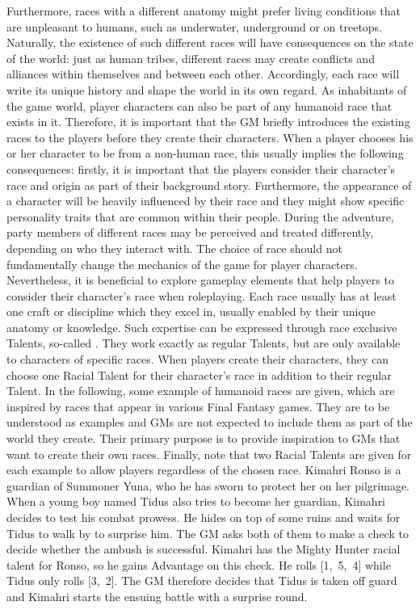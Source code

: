 Furthermore, races with a different anatomy might prefer living conditions that are unpleasant to humans, such as underwater, underground or on treetops.
Naturally, the existence of such different races will have consequences on the state of the world:
just as human tribes, different races may create conflicts and alliances within themselves and between each other.
Accordingly, each race will write its unique history and shape the world in its own regard.
%
\newpage
%
\ofpar
%
As inhabitants of the game world, player characters can also be part of any humanoid race that exists in it.
Therefore, it is important that the GM briefly introduces the existing races to the players before they create their characters.  
When a player chooses his or her character to be from a non-human race, this usually implies the following consequences:  
firstly, it is important that the players consider their character's race and origin as part of their background story.
Furthermore, the appearance of a character will be heavily influenced by their race and they might show specific personality traits that are common within their people. 
During the adventure, party members of different races may be perceived and treated differently, depending on who they interact with.
%
\vfill
%
The choice of race should not fundamentally change the mechanics of the game for player characters.
Nevertheless, it is beneficial to explore gameplay elements that help players to consider their character's race when roleplaying.
Each race usually has at least one craft or discipline which they excel in, usually enabled by their unique anatomy or knowledge.
Such expertise can be expressed through race exclusive Talents, so-called .
They work exactly as regular Talents, but are only available to characters of specific races.
When players create their characters, they can choose one Racial Talent for their character's race in addition to their regular Talent.
In the following, some example of humanoid races are given, which are inspired by races that appear in various Final Fantasy games.
They are to be understood as examples and GMs are not expected to include them as part of the world they create.
Their primary purpose is to provide inspiration to GMs that want to create their own races.
Finally, note that two Racial Talents are given for each example to allow players regardless of the chosen race.
%
\vfill
%
{
	Kimahri Ronso is a guardian of Summoner Yuna, who he has sworn to protect her on her pilgrimage. 
	When a young boy named Tidus also tries to become her guardian, Kimahri decides to test his combat prowess.
	He hides on top of some ruins and waits for Tidus to walk by to surprise him.
	The GM asks both of them to make a check to decide whether the ambush is successful.
 	Kimahri has the Mighty Hunter racial talent for Ronso, so he gains Advantage on this check.
	He rolls [1,~5,~4] while Tidus only rolls [3,~2].
	The GM therefore decides that Tidus is taken off guard and Kimahri starts the ensuing battle with a surprise round.
}
